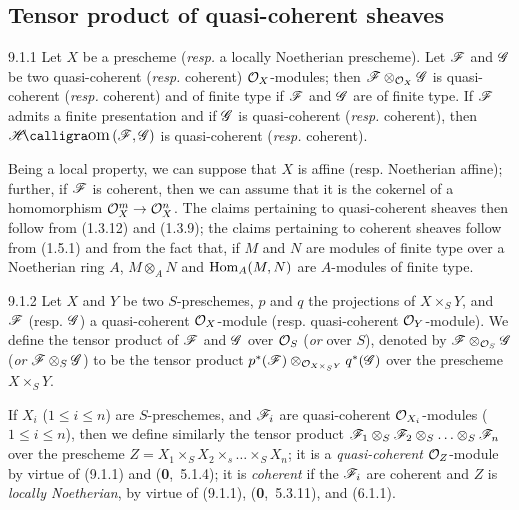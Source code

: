 \documentclass[../main.tex]{subfiles}
\begin{document}
\subsection{Tensor product of quasi-coherent sheaves}

\begin{cx}[Proposition]{9.1.1}
    Let $X$ be a prescheme (\emph{resp.} a locally Noetherian prescheme).
    Let $\mathscr{F}$ and $\mathscr{G}$ be two quasi-coherent (\emph{resp.} coherent) $\mathcal{O}_X$-modules; then $\mathscr{F}\otimes_{\mathcal{O}_X}\mathscr{G}$ is quasi-coherent (\emph{resp.} coherent) and of finite type if $\mathscr{F}$ and $\mathscr{G}$ are of finite type.
    If $\mathscr{F}$ admits a finite presentation and if $\mathscr{G}$ is quasi-coherent (\emph{resp.} coherent), then $\sheafHom(\scr{F},\scr{G})$ is quasi-coherent (\emph{resp.} coherent).
\end{cx}

Being a local property, we can suppose that $X$ is affine (resp. Noetherian affine); further, if $\mathscr{F}$ is coherent, then we can assume that it is the cokernel of a homomorphism $\mathcal{O}_X^m\to\mathcal{O}_X^n$.
The claims pertaining to quasi-coherent sheaves then follow from (1.3.12) and (1.3.9); the claims pertaining to coherent sheaves follow from (1.5.1) and from the fact that, if $M$ and $N$ are modules of finite type over a Noetherian ring $A$, $M\otimes_A N$ and $\operatorname*{Hom}_A(M,N)$ are $A$-modules of finite type.

\begin{cx}[Definition]{9.1.2}
    Let $X$ and $Y$ be two $S$-preschemes, $p$ and $q$ the projections of $X\times_S Y$, and $\mathscr{F}$ (resp. $\mathscr{G}$) a quasi-coherent $\mathcal{O}_X$-module (resp. quasi-coherent $\mathcal{O}_Y$-module).
    We define the tensor product of $\mathscr{F}$ and $\mathscr{G}$ over $\mathcal{O}_S$ (\emph{or} over $S$), denoted by $\mathscr{F}\otimes_{\mathcal{O}_S}\mathscr{G}$ (\emph{or} $\mathscr{F}\otimes_S\mathscr{G}$) to be the tensor product $p^*(\mathscr{F})\otimes_{\mathcal{O}_{X\times_S Y}}q^*(\mathscr{G})$ over the prescheme $X\times_S Y$.
\end{cx}


If $X_i$ ($1\leqslant i\leqslant n$) are $S$-preschemes, and $\mathscr{F}_i$ are quasi-coherent $\mathcal{O}_{X_i}$-modules ($1\leqslant i\leqslant n$), then we define similarly the tensor product $\mathscr{F}_1\otimes_S\mathscr{F}_2\otimes_S\ldots\otimes_S\mathscr{F}_n$ over the prescheme $Z=X_1\times_S X_2\times_s\ldots\times_S X_n$; it is a \emph{quasi-coherent} $\mathcal{O}_Z$-module by virtue of (9.1.1) and (\textbf{0},~5.1.4); it is \emph{coherent} if the $\mathscr{F}_i$ are coherent and $Z$ is \emph{locally Noetherian}, by virtue of (9.1.1), (\textbf{0},~5.3.11), and (6.1.1).
\end{document}
